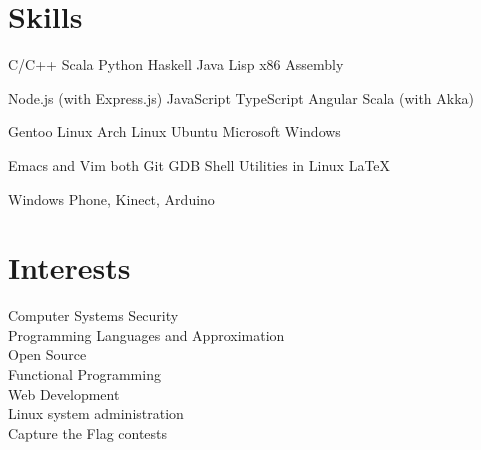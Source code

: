 \documentclass[a4paper]{deedy-resume} %
\begin{document}
\begin{minipage}[t]{0.33\textwidth}
  \sectionspace

  \section{Skills}

  \runsubsection{}
  C/C++ \textbullet{} Scala \textbullet{} Python \textbullet{} Haskell
  \textbullet{} Java \textbullet{} Lisp \textbullet{} x86 Assembly

  \sectionspace

  Node.js (with Express.js) \textbullet{} JavaScript \textbullet{} TypeScript
  \textbullet{} Angular \textbullet Scala (with Akka) \\

  \sectionspace

  Gentoo Linux \textbullet{} Arch Linux \textbullet{} Ubuntu \textbullet{}
  Microsoft Windows

  \sectionspace

  Emacs and Vim both \textbullet{} Git \textbullet{} GDB \textbullet{}
  Shell Utilities in Linux \textbullet{} LaTeX

  \sectionspace

  Windows Phone, Kinect, Arduino

  \section{Interests}
  Computer Systems Security\\
  Programming Languages and Approximation\\
  Open Source\\
  Functional Programming\\
  Web Development\\
  Linux system administration\\
  Capture the Flag contests

\end{minipage}
\hfill
\end{document}
